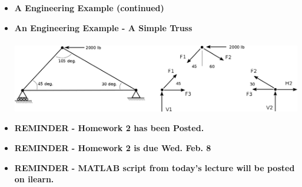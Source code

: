 \documentclass[11pt]{article}
\begin{document}
\begin{itemize}
\item \textbf{\LARGE A Engineering Example (continued)}\\			

\newpage
\item \textbf{\LARGE An Engineering Example - A Simple Truss}\\\\	
\includegraphics[scale=.30]{lecture2_fig2.png}
		

		




\newpage 

	\item \textbf{ \LARGE REMINDER - Homework 2 has been Posted.} \\
	 \item \textbf{ \LARGE REMINDER - Homework 2 is due Wed. Feb. 8} \\
	\item \textbf{ \LARGE REMINDER - MATLAB script from today's lecture will be posted on ilearn. } \\

\end{itemize}


	
\end{document}
